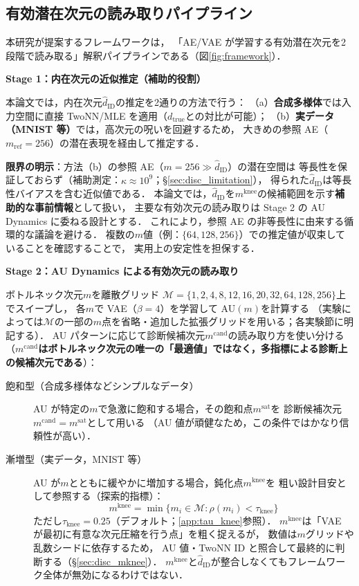 \documentclass[11pt,a4paper]{jsarticle}
\newcommand{\dzopt}{m^{\mathrm{cand}}}
\newcommand{\dtrue}{d_{\mathrm{true}}}
\newcommand{\kap}{\kappa}
\newcommand{\dzsat}{m^{\mathrm{sat}}}
\newcommand{\mknee}{m^{\mathrm{knee}}}
\begin{document}
\subsection{有効潜在次元の読み取りパイプライン}\label{sec:framework_pipeline}

本研究が提案するフレームワークは，
「AE/VAE が学習する有効潜在次元を2段階で読み取る」解釈パイプラインである（図\ref{fig:framework}）．

\textbf{Stage 1：内在次元の近似推定（補助的役割）}

本論文では，内在次元$\hat{d}_\mathrm{ID}$の推定を2通りの方法で行う：
（a）\textbf{合成多様体}では入力空間に直接 TwoNN/MLE を適用（$\dtrue$との対比が可能）；
（b）\textbf{実データ（MNIST 等）}では，高次元の呪いを回避するため，
大きめの参照 AE（$m_{\mathrm{ref}} = 256$）の潜在表現を経由して推定する．

\textbf{限界の明示}：方法（b）の参照 AE（$m = 256 \gg \hat{d}_\mathrm{ID}$）の潜在空間は
等長性を保証しておらず（補助測定：$\kap \approx 10^9$；§\ref{sec:disc_limitation}），
得られた$\hat{d}_\mathrm{ID}$は等長性バイアスを含む近似値である．
本論文では，$\hat{d}_\mathrm{ID}$を$\mknee$の候補範囲を示す\textbf{補助的な事前情報}として扱い，
主要な有効次元の読み取りは Stage 2 の AU Dynamics に委ねる設計とする．
これにより，参照 AE の非等長性に由来する循環的な議論を避ける．
複数の$m$値（例：$\{64, 128, 256\}$）での推定値が収束していることを確認することで，
実用上の安定性を担保する．

\textbf{Stage 2：AU Dynamics による有効次元の読み取り}

ボトルネック次元$m$を離散グリッド
$\mathcal{M} = \{1, 2, 4, 8, 12, 16, 20, 32, 64, 128, 256\}$上でスイープし，
各$m$で VAE（$\beta = 4$）を学習して AU$(m)$を計算する
（実験によっては$\mathcal{M}$の一部の$m$点を省略・追加した拡張グリッドを用いる；各実験節に明記する）．
AU パターンに応じて診断候補次元$\dzopt$の読み取り方を使い分ける
（\textbf{$\dzopt$はボトルネック次元の唯一の「最適値」ではなく，多指標による診断上の候補次元である}）：

\begin{description}
  \item[飽和型（合成多様体などシンプルなデータ）]
        AU が特定の$m$で急激に飽和する場合，その飽和点$\dzsat$を
        診断候補次元$\dzopt = \dzsat$として用いる
        （AU 値が頑健なため，この条件ではかなり信頼性が高い）．
  \item[漸増型（実データ，MNIST 等）]
        AU が$m$とともに緩やかに増加する場合，鈍化点$\mknee$を
        粗い設計目安として参照する（探索的指標）：
        \begin{equation}
          \mknee = \min\{m_i \in \mathcal{M} : \rho(m_i) < \tau_{\mathrm{knee}}\}
          \label{eq:mknee}
        \end{equation}
        ただし$\tau_{\mathrm{knee}} = 0.25$（デフォルト；\ref{app:tau_knee}参照）．
        $\mknee$は「VAE が最初に有意な次元圧縮を行う点」を粗く捉えるが，
        数値は$m$グリッドや乱数シードに依存するため，
        AU 値・TwoNN ID と照合して最終的に判断する（§\ref{sec:disc_mknee}）．
        $\mknee$と$\hat{d}_\mathrm{ID}$が整合しなくてもフレームワーク全体が無効になるわけではない．
\end{description}
\end{document}
